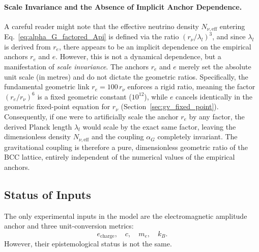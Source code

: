 \documentclass[10pt,a4paper]{article}
\begin{document}
\paragraph{Scale Invariance and the Absence of Implicit Anchor Dependence.}
A careful reader might note that the effective neutrino density \(N_{\nu,\text{eff}}\) entering Eq.~\eqref{eq:alpha_G_factored_Api} is defined via the ratio \((r_\nu/\lambda_l)^3\), and since \(\lambda_l\) is derived from \(r_e\), there appears to be an implicit dependence on the empirical anchors \(r_e\) and \(e\). However, this is not a dynamical dependence, but a manifestation of \emph{scale invariance}. The anchors \(r_e\) and \(e\) merely set the absolute unit scale (in metres) and do not dictate the geometric ratios. Specifically, the fundamental geometric link \(r_e = 100\,r_\nu\) enforces a rigid ratio, meaning the factor \((r_e/r_\nu)^6\) is a fixed geometric constant (\(10^{12}\)), while \(e\) cancels identically in the geometric fixed-point equation for \(r_\nu\) (Section~\ref{sec:gv_fixed_point}). Consequently, if one were to artificially scale the anchor \(r_e\) by any factor, the derived Planck length \(\lambda_l\) would scale by the exact same factor, leaving the dimensionless density \(N_{\nu,\text{eff}}\) and the coupling \(\alpha_G\) completely invariant. The gravitational coupling is therefore a pure, dimensionless geometric ratio of the BCC lattice, entirely independent of the numerical values of the empirical anchors.


\subsection{Status of Inputs}
\label{sec:inputs_planck}

The only experimental inputs in the model are the electromagnetic amplitude anchor and three unit-conversion metrics:
\begin{equation}
	e_{\text{charge}},\quad c,\quad m_e,\quad k_B .
\end{equation}
However, their epistemological status is not the same.
\end{document}
